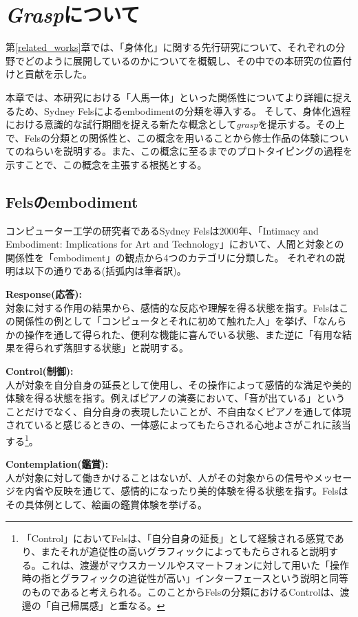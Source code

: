 \chapter{\textit{Grasp}について}
\label{graspについて}

第\ref{related_works}章では、「身体化」に関する先行研究について、それぞれの分野でどのように展開しているのかについてを概観し、その中での本研究の位置付けと貢献を示した。

本章では、本研究における「人馬一体」といった関係性についてより詳細に捉えるため、Sydney Felsによるembodimentの分類を導入する。
そして、身体化過程における意識的な試行期間を捉える新たな概念として\textit{grasp}を提示する。その上で、Felsの分類との関係性と、この概念を用いることから修士作品の体験についてのねらいを説明する。また、この概念に至るまでのプロトタイピングの過程を示すことで、この概念を主張する根拠とする。

\section{Felsのembodiment}
コンピューター工学の研究者であるSydney Felsは2000年、「Intimacy and Embodiment: Implications for Art and Technology」\cite{Fels}において、人間と対象との関係性を「embodiment」の観点から4つのカテゴリに分類した。
それぞれの説明は以下の通りである(括弧内は筆者訳)。

\textbf{Response(応答):}\\
対象に対する作用の結果から、感情的な反応や理解を得る状態を指す。Felsはこの関係性の例として「コンピュータとそれに初めて触れた人」を挙げ、「なんらかの操作を通して得られた、便利な機能に喜んでいる状態、また逆に「有用な結果を得られず落胆する状態」と説明する。

\textbf{Control(制御):}\\
人が対象を自分自身の延長として使用し、その操作によって感情的な満足や美的体験を得る状態を指す。例えばピアノの演奏において、「音が出ている」ということだけでなく、自分自身の表現したいことが、不自由なくピアノを通して体現されていると感じるときの、一体感によってもたらされる心地よさがこれに該当する\footnote{「Control」においてFelsは、「自分自身の延長」として経験される感覚であり、またそれが追従性の高いグラフィックによってもたらされると説明する。これは、渡邊がマウスカーソルやスマートフォンに対して用いた「操作時の指とグラフィックの追従性が高い」インターフェースという説明と同等のものであると考えられる。このことからFelsの分類におけるControlは、渡邊の「自己帰属感」と重なる。}。

\textbf{Contemplation(鑑賞):}\\
人が対象に対して働きかけることはないが、人がその対象からの信号やメッセージを内省や反映を通じて、感情的になったり美的体験を得る状態を指す。Felsはその具体例として、絵画の鑑賞体験を挙げる。

